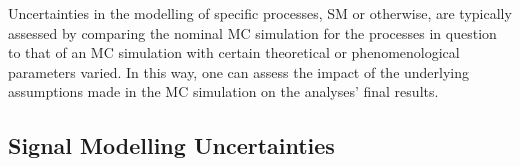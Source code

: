 Uncertainties in the modelling of specific processes, SM or otherwise, are typically
assessed by comparing the nominal MC simulation for the processes in question to
that of an MC simulation with certain theoretical or phenomenological parameters varied.
In this way, one can assess the impact of the underlying assumptions made
in the MC simulation on the analyses' final results.

%
%

\subsection{Signal Modelling Uncertainties}
\label{sec:syst_sig_modelling}
